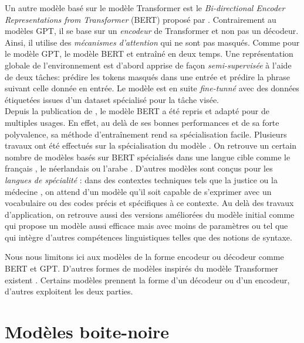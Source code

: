 \documentclass{report}
\begin{document}
    Un autre modèle basé sur le modèle Transformer est le \emph{Bi-directional Encoder Representations from Transformer} (BERT) proposé par \cite{devlin_bert_2019}. Contrairement au modèles GPT, il se base sur un \emph{encodeur} de Transformer et non pas un décodeur. Ainsi, il utilise des \emph{mécanismes d'attention} qui ne sont pas masqués. Comme pour le modèle GPT, le modèle BERT et entraîné en deux temps. Une représentation globale de l'environnement est d'abord apprise de façon \emph{semi-supervisée} à l'aide de deux tâches: prédire les tokens masqués dans une entrée et prédire la phrase suivant celle donnée en entrée. Le modèle est en suite \emph{fine-tunné} avec des données étiquetées issues d'un dataset spécialisé pour la tâche visée.\\
    Depuis la publication de \cite{devlin_bert_2019}, le modèle BERT a été repris et adapté pour de multiples usages. En effet, au delà de ses bonnes performances et de sa forte polyvalence, sa méthode d'entraînement rend sa spécialisation facile. Plusieurs travaux ont été effectués sur la spécialisation du modèle \cite{aftan_survey_2023}. On retrouve un certain nombre de modèles basés sur BERT spécialisés dans une langue cible comme le français \cite{segonne_jargon_2024, martin_camembert_2020}, le néerlandais \cite{delobelle_robbert_2020} ou l'arabe \cite{antoun_arabert_2021}. D'autres modèles sont conçus pour les \emph{langues de spécialité} : dans des contextes techniques tels que la justice \cite{douka_juribert_2021} ou la médecine \cite{lee_biobert_2020}, on attend d'un modèle qu'il soit capable de s'exprimer avec un vocabulaire ou des codes précis et spécifiques à ce contexte. Au delà des travaux d'application, on retrouve aussi des versions améliorées du modèle initial comme \cite{sanh_distilbert_2020} qui propose un modèle aussi efficace mais avec moins de paramètres ou tel que \cite{wahab_dibert_2021} qui intègre d'autres compétences linguistiques telles que des notions de syntaxe. 
    
    Nous nous limitons ici aux modèles de la forme encodeur ou décodeur comme BERT et GPT. D'autres formes de modèles inspirés du modèle Transformer existent \cite{touvron_llama_2023, raffel_exploring_2020}. Certains modèles prennent la forme d'un décodeur ou d'un encodeur, d'autres exploitent les deux parties. 
    
    
\section{Modèles boite-noire}
\end{document}
